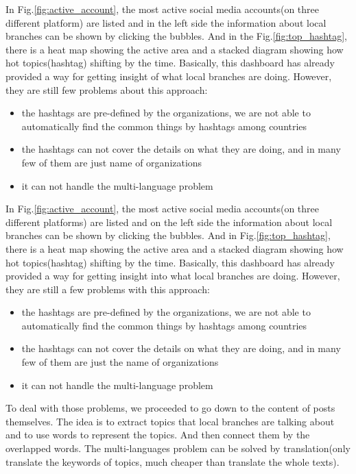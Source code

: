 \documentclass[sigchi]{acmart}
\begin{document}
In Fig.\ref{fig:active_account}, the most active social media accounts(on three different platform) are listed and in the left side the information about local branches can be shown by clicking the bubbles. And in the Fig.\ref{fig:top_hashtag}, there is a heat map showing the active area and a stacked diagram showing how hot topics(hashtag) shifting by the time. Basically, this dashboard has already provided a way for getting insight of what local branches are doing. However, they are still few problems about this approach:
\begin{itemize}
    \item the hashtags are pre-defined by the organizations, we are not able to automatically find the common things by hashtags among countries 
    \item the hashtags can not cover the details on what they are doing, and in many few of them are just name of organizations
    \item it can not handle the multi-language problem
\end{itemize}
In Fig.\ref{fig:active_account}, the most active social media accounts(on three different platforms) are listed and on the left side the information about local branches can be shown by clicking the bubbles. And in Fig.\ref{fig:top_hashtag}, there is a heat map showing the active area and a stacked diagram showing how hot topics(hashtag) shifting by the time. Basically, this dashboard has already provided a way for getting insight into what local branches are doing. However, they are still a few problems with this approach:
\begin{itemize}
    \item the hashtags are pre-defined by the organizations, we are not able to automatically find the common things by hashtags among countries 
    \item the hashtags can not cover the details on what they are doing, and in many few of them are just the name of organizations
    \item it can not handle the multi-language problem
\end{itemize}
To deal with those problems, we proceeded to go down to the content of posts themselves. The idea is to extract topics that local branches are talking about and to use words to represent the topics. And then connect them by the overlapped words. The multi-languages problem can be solved by translation(only translate the keywords of topics, much cheaper than translate the whole texts).
\end{document}
